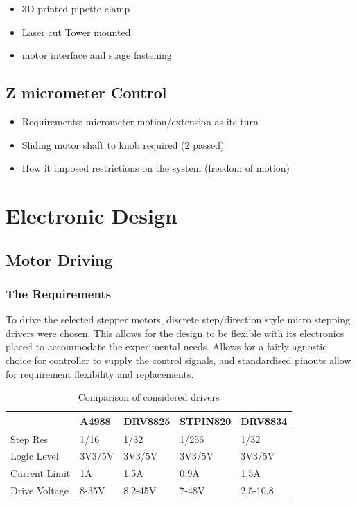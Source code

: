 \begin{itemize}
    \item 3D printed pipette clamp
    \item Laser cut Tower mounted
    \item motor interface and stage fastening  
\end{itemize}

\subsection{Z micrometer Control}
\begin{itemize}
    \item Requirements: micrometer motion/extension as its turn
    \item Sliding motor shaft to knob required (2 passed)
    \item How it imposed restrictions on the system (freedom of motion)  
\end{itemize}

\section{Electronic Design}

\subsection{Motor Driving}

\subsubsection*{The Requirements}
To drive the selected stepper motors, discrete step/direction style micro stepping drivers were chosen. This allows for the design to be flexible with its electronics placed to accommodate the experimental needs. Allows for a fairly agnostic choice for controller to supply the control signals, and standardised pinouts allow for requirement flexibility and replacements.

\begin{table}[h]
    \centering
    \begin{tabular}{|l|l|l|l|l|}
        \hline
        \textbf{}     & \textbf{A4988} & \textbf{DRV8825} & \textbf{STPIN820} & \textbf{DRV8834} \\ \hline
        Step Res      & 1/16           & 1/32             & 1/256             & 1/32             \\ \hline
        Logic Level   & 3V3/5V         & 3V3/5V           & 3V3/5V            & 3V3/5V           \\ \hline
        Current Limit & 1A             & 1.5A             & 0.9A              & 1.5A             \\ \hline
        Drive Voltage & 8-35V          & 8.2-45V          & 7-48V             & 2.5-10.8         \\ \hline
    \end{tabular}
    \caption{Comparison of considered drivers}
\end{table}

